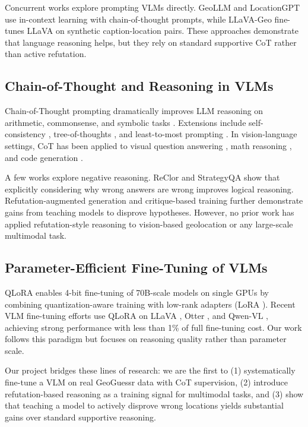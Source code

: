 \documentclass[11pt,a4paper]{article}
\begin{document}
Concurrent works explore prompting VLMs directly. GeoLLM \cite{li2024geollm} and LocationGPT \cite{zhang2024locationgpt} use in-context learning with chain-of-thought prompts, while LLaVA-Geo \cite{liu2024llava} fine-tunes LLaVA on synthetic caption-location pairs. These approaches demonstrate that language reasoning helps, but they rely on standard supportive CoT rather than active refutation.

\subsection{Chain-of-Thought and Reasoning in VLMs}
Chain-of-Thought prompting \cite{wei2022chain} dramatically improves LLM reasoning on arithmetic, commonsense, and symbolic tasks \cite{kojima2022large}. Extensions include self-consistency \cite{wang2022self}, tree-of-thoughts \cite{yao2024tree}, and least-to-most prompting \cite{zhou2022least}. In vision-language settings, CoT has been applied to visual question answering \cite{zhang2023embracing}, math reasoning \cite{lu2023multimodal}, and code generation \cite{chen2023visual}.

A few works explore negative reasoning. ReClor \cite{yu2020reclor} and StrategyQA \cite{geva2021strategyqa} show that explicitly considering why wrong answers are wrong improves logical reasoning. Refutation-augmented generation \cite{kim2023refutation} and critique-based training \cite{gou2024critic} further demonstrate gains from teaching models to disprove hypotheses. However, no prior work has applied refutation-style reasoning to vision-based geolocation or any large-scale multimodal task.

\subsection{Parameter-Efficient Fine-Tuning of VLMs}
QLoRA \cite{dettmers2024qlora} enables 4-bit fine-tuning of 70B-scale models on single GPUs by combining quantization-aware training with low-rank adapters (LoRA \cite{hu2021lora}). Recent VLM fine-tuning efforts use QLoRA on LLaVA \cite{liu2024llava, liu2024llava-next}, Otter \cite{li2023otter}, and Qwen-VL \cite{bai2023qwen}, achieving strong performance with less than 1\% of full fine-tuning cost. Our work follows this paradigm but focuses on reasoning quality rather than parameter scale.

Our project bridges these lines of research: we are the first to (1) systematically fine-tune a VLM on real GeoGuessr data with CoT supervision, (2) introduce refutation-based reasoning as a training signal for multimodal tasks, and (3) show that teaching a model to actively disprove wrong locations yields substantial gains over standard supportive reasoning.
\end{document}
